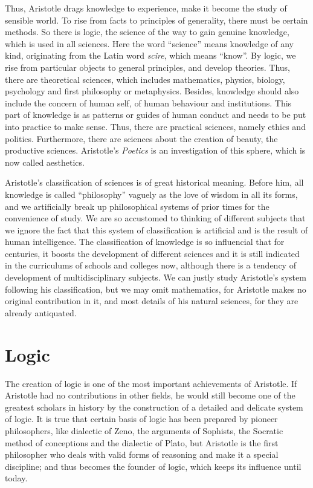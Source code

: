 \documentclass[11pt]{article}
\begin{document}
\newline

Thus, Aristotle drags knowledge to experience, make it become the study of sensible world. 
To rise from facts to principles of generality, there must be certain methods. 
So there is logic, the science of the way to gain genuine knowledge, which is used in all sciences. 
Here the word “science” means knowledge of any kind, originating from the Latin word \textit{scire}, which means “know”. 
By logic, we rise from particular objects to general principles, and develop theories. 
Thus, there are theoretical sciences, which includes mathematics, physics, biology, psychology and first philosophy or metaphysics. 
Besides, knowledge should also include the concern of human self, of human behaviour and institutions. 
This part of knowledge is as patterns or guides of human conduct and needs to be put into practice to make sense. 
Thus, there are practical sciences, namely ethics and politics. 
Furthermore, there are sciences about the creation of beauty, the productive sciences. 
Aristotle’s \textit{Poetics} is an investigation of this sphere, which is now called aesthetics.

\newline

Aristotle’s classification of sciences is of great historical meaning. 
Before him, all knowledge is called “philosophy” vaguely as the love of wisdom in all its forms, and we artificially break up philosophical systems of prior times for the convenience of study. 
We are so accustomed to thinking of different subjects that we ignore the fact that this system of classification is artificial and is the result of human intelligence. 
The classification of knowledge is so influencial that for centuries, it boosts the development of different sciences and it is still indicated in the curriculums of schools and colleges now, although there is a tendency of development of multidisciplinary subjects. 
We can justly study Aristotle’s system following his classification, but we may omit mathematics, for Aristotle makes no original contribution in it, and most details of his natural sciences, for they are already antiquated. 

\section{Logic}
The creation of logic is one of the most important achievements of Aristotle. 
If Aristotle had no contributions in other fields, he would still become one of the greatest scholars in history by the construction of a detailed and delicate system of logic. 
It is true that certain basis of logic has been prepared by pioneer philosophers, like dialectic of Zeno, the arguments of Sophists, the Socratic method of conceptions and the dialectic of Plato, but Aristotle is the first philosopher who deals with valid forms of reasoning and make it a special discipline; 
and thus becomes the founder of logic, which keeps its influence until today.
\end{document}
